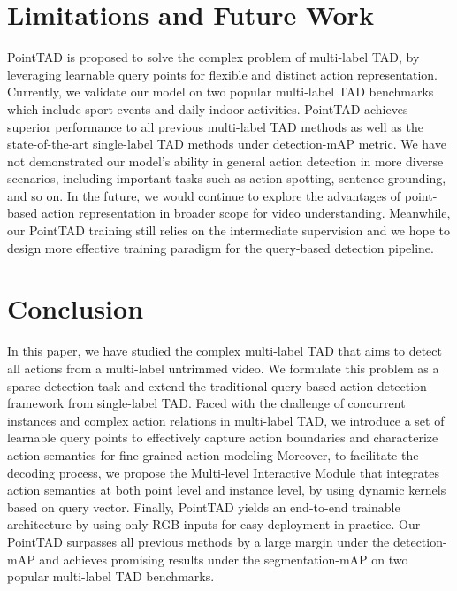 \documentclass{article}
\begin{document}
\vspace{-0.5em}
\section{Limitations and Future Work}
\label{sec:limitation}
\vspace{-0.5em}
PointTAD is proposed to solve the complex problem of multi-label TAD, by leveraging learnable query points for flexible and distinct action representation. Currently, we validate our model on two popular multi-label TAD benchmarks which include sport events and daily indoor activities. PointTAD achieves superior performance to all previous multi-label TAD methods as well as the state-of-the-art single-label TAD methods under detection-mAP metric. We have not demonstrated our model’s ability in general action detection in more diverse scenarios, including important tasks such as action spotting, sentence grounding, and so on. In the future, we would continue to explore the advantages of point-based action representation in broader scope for video understanding. Meanwhile, our PointTAD training still relies on the intermediate supervision and we hope to design more effective training paradigm for the query-based detection pipeline.

\vspace{-0.5em}
\section{Conclusion}
\vspace{-0.5em}
In this paper, we have studied the complex multi-label TAD that aims to detect all actions from a multi-label untrimmed video. We formulate this problem as a sparse detection task and extend the traditional query-based action detection framework from single-label TAD. Faced with the challenge of concurrent instances and complex action relations in multi-label TAD, we introduce a set of learnable query points to effectively capture action boundaries and characterize action semantics for fine-grained action modeling Moreover, to facilitate the decoding process, we propose the Multi-level Interactive Module that integrates action semantics at both point level and instance level, by using dynamic kernels based on query vector. Finally, PointTAD yields an end-to-end trainable architecture by using only RGB inputs for easy deployment in practice. Our PointTAD surpasses all previous methods by a large margin under the detection-mAP and achieves promising results under the segmentation-mAP on two popular multi-label TAD benchmarks. 
\end{document}
